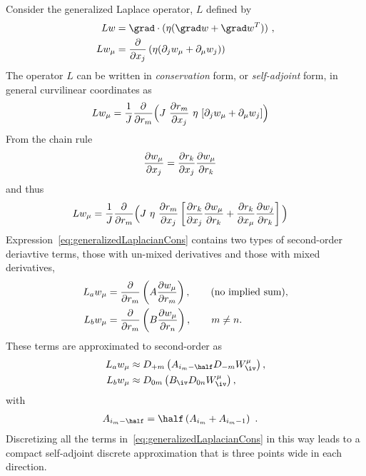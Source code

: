 Consider the generalized Laplace operator, $L$ defined by 
\begin{align}
  L w &= \grad\cdot( \eta (\grad w + \grad w^T) ) ~, \\
  L w_\mu &= {\partial \over \partial x_j}\left( \eta( \partial_j w_\mu + \partial_\mu w_j ) \right)
\end{align}
% 
The operator $L$ can be written in {\em conservation} form, or {\em self-adjoint} form, 
in general curvilinear coordinates as
\begin{align}
  L w_\mu &= \frac{1}{J}  {\partial \over\partial r_m}\Big(
                J~  {\partial r_m\over\partial x_j} ~\eta~[ \partial_j w_\mu + \partial_\mu w_j ]
                \Big)  
\end{align}
From the chain rule
\begin{align}
  {\partial w_\mu \over \partial x_j} &= {\partial r_k \over\partial x_j} {\partial w_\mu \over\partial r_k}
\end{align}
and thus
\begin{align}
  L w_\mu &= \frac{1}{J} {\partial \over\partial r_m}\Big(
                J~\eta~  {\partial r_m\over\partial x_j}
          \left[  {\partial r_k \over\partial x_j} {\partial w_\mu \over\partial r_k}
                    + {\partial r_k \over\partial x_\mu} {\partial w_j \over\partial r_k} \right]
                \Big)  \label{eq:generalizedLaplacianCons}
\end{align}
% 
Expression~\eqref{eq:generalizedLaplacianCons}
contains two types of second-order deriavtive terms, those with un-mixed derivatives
and those with mixed derivatives,
\begin{align}
   L_a w_\mu &= {\partial\over\partial r_m}\left( A {\partial w_\mu \over\partial r_m} \right), \qquad\text{(no implied sum)}, \\
   L_b w_\mu &= {\partial\over\partial r_m}\left( B {\partial w_\mu \over\partial r_n} \right), \qquad\text{$m\ne n$}.
\end{align}
% 
These terms are approximated to second-order as
\begin{align}
   L_a w_\mu &\approx D_{+m}\left( A_{i_m-\half} D_{-m} W^\mu_{\iv}\right), \label{eq:unMixedTerm} \\
   L_b w_\mu &\approx D_{0m}\left( B_\iv D_{0n} W^\mu_\iv\right) ,         \label{eq:mixedTerm}
\end{align}
with 
\begin{align}
   A_{i_m-\half} &= \half\left( A_{i_m} + A_{i_m-1}  \right) ~. \label{eq:ave}
\end{align}
Discretizing all the terms in~\eqref{eq:generalizedLaplacianCons} in this way leads to a compact self-adjoint
discrete approximation that is three points wide in each direction.

